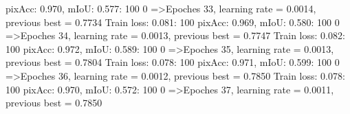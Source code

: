pixAcc: 0.970, mIoU: 0.577: 100%
  0%
=>Epoches 33, learning rate = 0.0014,                 previous best = 0.7734
Train loss: 0.081: 100%
pixAcc: 0.969, mIoU: 0.580: 100%
  0%
=>Epoches 34, learning rate = 0.0013,                 previous best = 0.7747
Train loss: 0.082: 100%
pixAcc: 0.972, mIoU: 0.589: 100%
  0%
=>Epoches 35, learning rate = 0.0013,                 previous best = 0.7804
Train loss: 0.078: 100%
pixAcc: 0.971, mIoU: 0.599: 100%
  0%
=>Epoches 36, learning rate = 0.0012,                 previous best = 0.7850
Train loss: 0.078: 100%
pixAcc: 0.970, mIoU: 0.572: 100%
  0%
=>Epoches 37, learning rate = 0.0011,                 previous best = 0.7850
